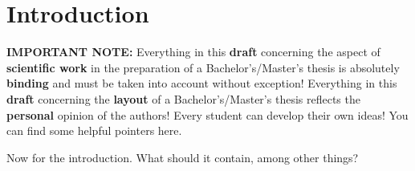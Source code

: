 \documentclass[12pt]{report}           %
\renewcommand{\lstlistlistingname}{Quellcodeverzeichnis}
\theoremstyle{thesis}        %
\newcommand{\listofpseudocodename}{Pseudocodeverzeichnis}
\newcommand{\listofpseudocode}{\listof{pseudocode}{\listofpseudocodename}}
\begin{document}
	{
		\baselineskip=15pt %
		\tableofcontents   %
	}
	{
		\baselineskip=22pt %
		
		
		
		
		
		
		
		
	}
	
	
	\chapter{Introduction}
	\label{chap:einleitung}
	\pagestyle{fancy}
	
	{\bf IMPORTANT NOTE:} 
	Everything in this {\bf draft} concerning the aspect of {\bf scientific work} in the preparation of a Bachelor's/Master's thesis is absolutely {\bf binding} and must be taken into account without exception!
	Everything in this {\bf draft} concerning the {\bf layout} of a Bachelor's/Master's thesis reflects the {\bf personal} opinion of the authors! Every student can develop their own ideas! You can find some helpful pointers here.
	
	Now for the introduction. What should it contain, among other things?
	
\end{document}
